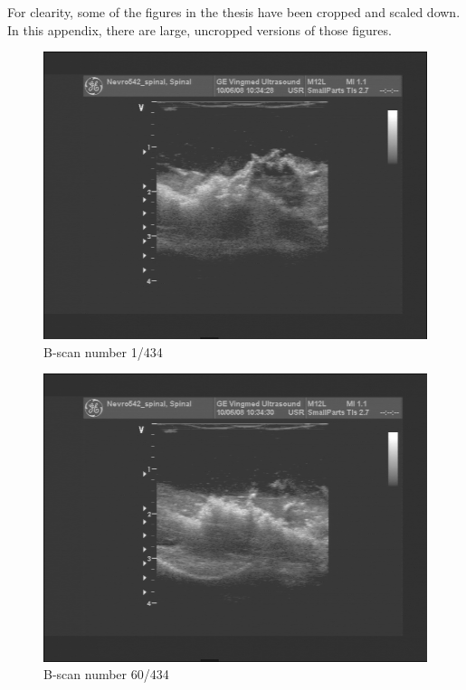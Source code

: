 For clearity, some of the figures in the thesis have been cropped and scaled down. In this appendix, there are large, uncropped versions of those figures.

\begin{figure}[h]
\centering
\includegraphics[height=0.45\textheight]{graphics/1.png}
\caption{B-scan number 1/434}
\label{fig:1}
\end{figure}

\begin{figure}[h]
\centering
\includegraphics[height=0.45\textheight]{graphics/60.png}
\caption{B-scan number 60/434}
\label{fig:60}
\end{figure}


